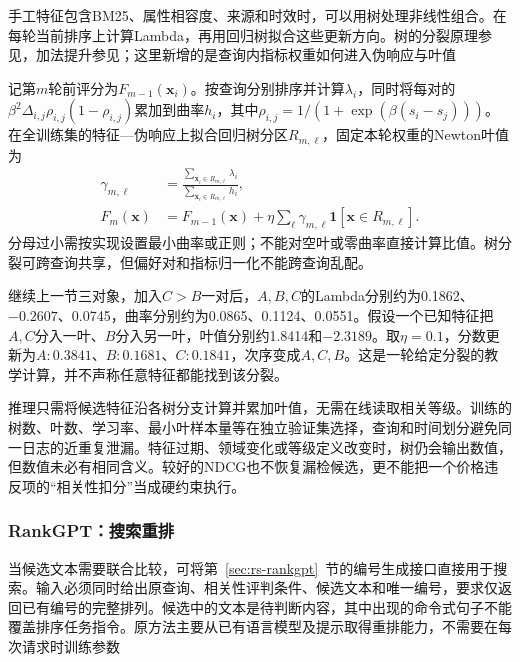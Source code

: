 手工特征包含BM25、属性相容度、来源和时效时，可以用树处理非线性组合。在每轮当前排序上计算Lambda，再用回归树拟合这些更新方向。树的分裂原理参见，加法提升参见；这里新增的是查询内指标权重如何进入伪响应与叶值

记第$m$轮前评分为$F_{m-1}(\bm x_i)$。按查询分别排序并计算$\lambda_i$，同时将每对的
$\beta^2\Delta_{i,j}\rho_{i,j}(1-\rho_{i,j})$累加到曲率$h_i$，其中$\rho_{i,j}=1/(1+\exp(\beta(s_i-s_j)))$。在全训练集的特征—伪响应上拟合回归树分区$R_{m,\ell}$，固定本轮权重的Newton叶值为
\begin{equation}
 \begin{split}
 \gamma_{m,\ell}&=
 \frac{\sum_{\bm x_i\in R_{m,\ell}}\lambda_i}
      {\sum_{\bm x_i\in R_{m,\ell}}h_i},\\
 F_m(\bm x)&=F_{m-1}(\bm x)+
 \eta\sum_\ell\gamma_{m,\ell}\mathbf1[\bm x\in R_{m,\ell}].
 \end{split}
 \label{eq:rs-search-lambdamart}
\end{equation}
分母过小需按实现设置最小曲率或正则；不能对空叶或零曲率直接计算比值。树分裂可跨查询共享，但偏好对和指标归一化不能跨查询乱配。

继续上一节三对象，加入$C>B$一对后，$A,B,C$的Lambda分别约为0.1862、$-0.2607$、0.0745，曲率分别约为0.0865、0.1124、0.0551。假设一个已知特征把$A,C$分入一叶、$B$分入另一叶，叶值分别约1.8414和$-2.3189$。取$\eta=0.1$，分数更新为$A:0.3841$、$B:0.1681$、$C:0.1841$，次序变成$A,C,B$。这是一轮给定分裂的教学计算，并不声称任意特征都能找到该分裂。

推理只需将候选特征沿各树分支计算并累加叶值，无需在线读取相关等级。训练的树数、叶数、学习率、最小叶样本量等在独立验证集选择，查询和时间划分避免同一日志的近重复泄漏。特征过期、领域变化或等级定义改变时，树仍会输出数值，但数值未必有相同含义。较好的NDCG也不恢复漏检候选，更不能把一个价格违反项的“相关性扣分”当成硬约束执行。

\Needspace{100mm}
\subsubsection{RankGPT：搜索重排}
\label{sec:rs-search-rankgpt}

当候选文本需要联合比较，可将第~\ref{sec:rs-rankgpt}~节的编号生成接口直接用于搜索。输入必须同时给出原查询、相关性评判条件、候选文本和唯一编号，要求仅返回已有编号的完整排列。候选中的文本是待判断内容，其中出现的命令式句子不能覆盖排序任务指令。原方法主要从已有语言模型及提示取得重排能力，不需要在每次请求时训练参数


